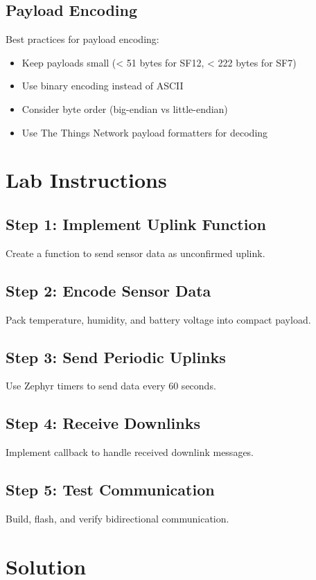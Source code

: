 \documentclass[11pt,a4paper]{article}
\begin{document}
\subsection{Payload Encoding}
Best practices for payload encoding:
\begin{itemize}
    \item Keep payloads small (< 51 bytes for SF12, < 222 bytes for SF7)
    \item Use binary encoding instead of ASCII
    \item Consider byte order (big-endian vs little-endian)
    \item Use The Things Network payload formatters for decoding
\end{itemize}

\section{Lab Instructions}

\subsection{Step 1: Implement Uplink Function}
Create a function to send sensor data as unconfirmed uplink.

\subsection{Step 2: Encode Sensor Data}
Pack temperature, humidity, and battery voltage into compact payload.

\subsection{Step 3: Send Periodic Uplinks}
Use Zephyr timers to send data every 60 seconds.

\subsection{Step 4: Receive Downlinks}
Implement callback to handle received downlink messages.

\subsection{Step 5: Test Communication}
Build, flash, and verify bidirectional communication.

\section{Solution}
\end{document}
